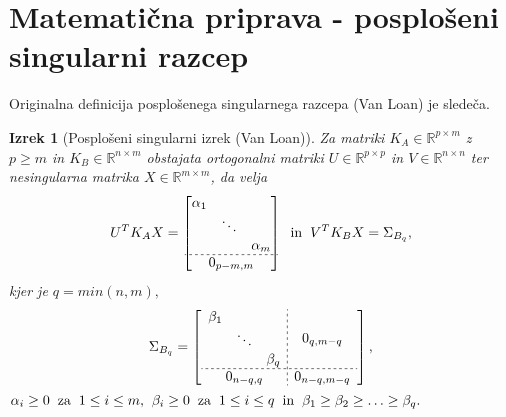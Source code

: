 \documentclass[mat1]{article}
\newtheorem{izrek}{Izrek}
\theoremstyle{definition}
\begin{document}
\section{Matematična priprava - posplošeni singularni razcep}
Originalna definicija posplošenega singularnega razcepa (Van Loan) je sledeča.

\begin{izrek}[Posplošeni singularni izrek (Van Loan)]
\label{izrek:SVD} Za matriki $K_A \in \mathbb{R}^{p \times m}$ z $p \geq m$ in $K_B \in \mathbb{R}^{n \times m}$ obstajata ortogonalni matriki $U \in \mathbb{R}^{p \times p}$ in $V \in \mathbb{R}^{n \times n}$ ter nesingularna matrika $X \in \mathbb{R}^{m \times m}$, da velja 
$$ U^T K_A X = 
\begin{bmatrix}
\begin{matrix}
\alpha_1 & & \\
 & \ddots & \\
 & & \alpha_m
\end{matrix} \\ \hdashline[2pt/2pt]
0_{p-m, m}
\end{bmatrix} 
\hspace{2mm} \text{in} \hspace{2mm}
 V^T K_B X = 
\Sigma_{B_q} \text{,}
$$ kjer je $q = min(n,m) \text{,}$
\begin{gather*}
\Sigma_{B_q} = 
\left[
\begin{array}{c;{2pt/2pt}c}
\begin{matrix}
\beta_1 & & \\
 & \ddots & \\
 & & \beta_q
\end{matrix} & 0_{q, m - q}
 \\ \hdashline[2pt/2pt]
0_{n-q, q} & 0_{n-q, m-q}
\end{array} \right] \text{,} 
\end{gather*} %
$
\alpha_i \geq 0 \hspace{2mm} \text{za} \hspace{2mm}
 1 \leq i \leq m \text{,} \hspace{2mm}
  \beta_i \geq 0 \hspace{2mm} \text{za} \hspace{2mm} 1 \leq i \leq q
\hspace{2mm} \text{in} \hspace{2mm} \beta_1 \geq \beta_2 \geq \ldots \geq \beta_q
\text{.}
$
\end{izrek}
\end{document}
